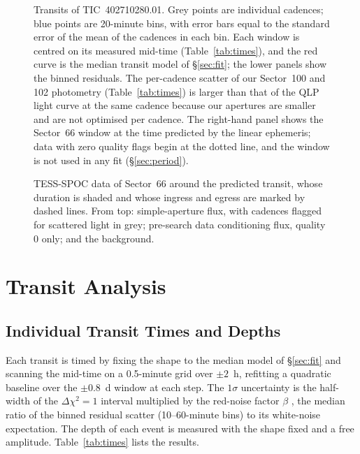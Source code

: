 \documentclass[twocolumn]{aastex631}
\newcommand{\planet}{TIC~402710280.01}
\begin{document}
\begin{figure}
\caption{Transits of \planet. Grey points are individual cadences; blue points are 20-minute bins, with error bars equal to the standard error of the mean of the cadences in each bin. Each window is centred on its measured mid-time (Table~\ref{tab:times}), and the red curve is the median transit model of \S\ref{sec:fit}; the lower panels show the binned residuals. The per-cadence scatter of our Sector~100 and 102 photometry (Table~\ref{tab:times}) is larger than that of the QLP light curve at the same cadence because our apertures are smaller and are not optimised per cadence. The right-hand panel shows the Sector~66 window at the time predicted by the linear ephemeris; data with zero quality flags begin at the dotted line, and the window is not used in any fit (\S\ref{sec:period}).\label{fig:transits}}
\end{figure}

\begin{figure}
\caption{TESS-SPOC data of Sector~66 around the predicted transit, whose duration is shaded and whose ingress and egress are marked by dashed lines. From top: simple-aperture flux, with cadences flagged for scattered light in grey; pre-search data conditioning flux, quality 0 only; and the background.\label{fig:s66}}
\end{figure}

\section{Transit Analysis} \label{sec:analysis}

\subsection{Individual Transit Times and Depths} \label{sec:times}

Each transit is timed by fixing the shape to the median model of \S\ref{sec:fit} and scanning the mid-time on a 0.5-minute grid over $\pm 2$~h, refitting a quadratic baseline over the $\pm 0.8$~d window at each step. The $1\sigma$ uncertainty is the half-width of the $\Delta\chi^2 = 1$ interval multiplied by the red-noise factor $\beta$ \citep{Pont2006, Winn2008}, the median ratio of the binned residual scatter (10--60-minute bins) to its white-noise expectation. The depth of each event is measured with the shape fixed and a free amplitude. Table~\ref{tab:times} lists the results.
\end{document}
